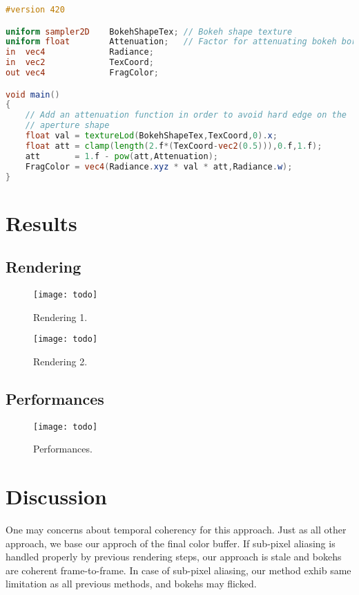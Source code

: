 \begin{lstlisting}[language=GLSL,float={htb},caption={Fragment shader for rendering bokeh.},label={YourName:listing1}]
#version 420

uniform sampler2D    BokehShapeTex; // Bokeh shape texture
uniform float        Attenuation;   // Factor for attenuating bokeh borders
in  vec4             Radiance;
in  vec2             TexCoord;
out vec4             FragColor;

void main()
{
	// Add an attenuation function in order to avoid hard edge on the 
	// aperture shape
	float val = textureLod(BokehShapeTex,TexCoord,0).x;
	float att = clamp(length(2.f*(TexCoord-vec2(0.5))),0.f,1.f);
	att       = 1.f - pow(att,Attenuation);
	FragColor = vec4(Radiance.xyz * val * att,Radiance.w);
}
\end{lstlisting}


\section{Results}

\subsection{Rendering}
	\begin{figure}[htb]\centering
	\texttt{[image: todo]}
	\caption{Rendering 1.}
	\label{YourName:fig1}
	\end{figure}

	\begin{figure}[htb]\centering
	\texttt{[image: todo]}
	\caption{Rendering 2.}
	\label{YourName:fig1}
	\end{figure}

\subsection{Performances}
	\begin{figure}[htb]\centering
	\texttt{[image: todo]}
	\caption{Performances.}
	\label{YourName:fig1}
	\end{figure}

\section{Discussion}
One may concerns about temporal coherency for this approach. Just as all other approach, we base our approch of the final color buffer. If sub-pixel aliasing is handled properly by previous rendering steps, our approach is stale and bokehs are coherent frame-to-frame. In case of sub-pixel aliasing, our method exhib same limitation as all previous methods, and bokehs may flicked.

